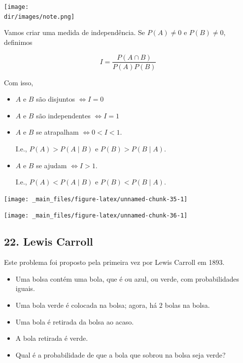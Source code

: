\documentclass[
  11pt]{report}
\newcommand{\dir}{/ssd/R/x86_64-pc-linux-gnu-library/4.1/fnaufelRmd/rmarkdown/resources}
\newenvironment{rmdnote}
{
  \begin{mynote}
    \texttt{[image: \\dir/images/note.png]}
    \tcblower
  }
  {
  \end{mynote}
}
\begin{document}
\hypertarget{i}{}
\begin{rmdnote}

Vamos criar uma medida de independência. Se $P(A) \neq 0$ e $P(B) \neq 0$, definimos

\[
I = \frac{P(A \cap B)}{P(A)P(B)}
\]

Com isso,

\begin{itemize}
\item
  $A$ e $B$ são disjuntos ${} \iff I = 0$
\item
  $A$ e $B$ são independentes ${} \iff I = 1$
\item
  $A$ e $B$ se atrapalham ${} \iff 0 < I < 1$.

  I.e., $P(A) > P(A \mid B)$ e $P(B) > P(B \mid A)$.
\item
  $A$ e $B$ se ajudam ${} \iff I > 1$.

  I.e., $P(A) < P(A \mid B)$ e $P(B) < P(B \mid A)$.
\end{itemize}

\end{rmdnote}

\begin{center}\texttt{[image: \_main\_files/figure-latex/unnamed-chunk-35-1]} \end{center}

\begin{center}\texttt{[image: \_main\_files/figure-latex/unnamed-chunk-36-1]} \end{center}

\hypertarget{lewis-carroll}{%
\subsection*{22. Lewis Carroll}\label{lewis-carroll}}

\begin{rmdbox}

Este problema foi proposto pela primeira vez por Lewis Carroll em 1893.

\begin{itemize}
\item
  Uma bolsa contém uma bola, que é ou azul, ou verde, com probabilidades iguais.
\item
  Uma bola verde é colocada na bolsa; agora, há $2$ bolas na bolsa.
\item
  Uma bola é retirada da bolsa ao acaso.
\item
  A bola retirada é verde.
\item
  Qual é a probabilidade de que a bola que sobrou na bolsa seja verde?
\end{itemize}

\end{rmdbox}
\end{document}
